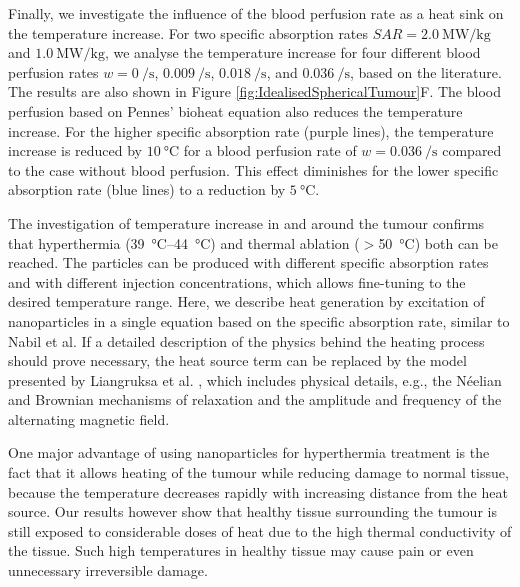 \documentclass[Times1COL,AMA]{WileyNJDv5} %
\begin{document}
Finally, we investigate the influence of the blood perfusion rate as a heat sink on the temperature increase.
For two specific absorption rates $SAR = \SI{2.0}{\mega\watt\per\kilo\gram}$ and $\SI{1.0}{\mega\watt\per\kilo\gram}$, we analyse the temperature increase for four different blood perfusion rates $w = \SI[per-mode=reciprocal]{0}{\per\second}$, $\SI[per-mode=reciprocal]{0.009}{\per\second}$, $\SI[per-mode=reciprocal]{0.018}{\per\second}$, and $\SI[per-mode=reciprocal]{0.036}{\per\second}$, based on the literature. \cite{Cervadoro2013}
The results are also shown in Figure \ref{fig:IdealisedSphericalTumour}F.
The blood perfusion based on Pennes' bioheat equation also reduces the temperature increase.
For the higher specific absorption rate (purple lines), the temperature increase is reduced by $\SI{10}{\celsius}$ for a blood perfusion rate of $w = \SI[per-mode=reciprocal]{0.036}{\per\second}$ compared to the case without blood perfusion.
This effect diminishes for the lower specific absorption rate (blue lines) to a reduction by $\SI{5}{\celsius}$.

The investigation of temperature increase in and around the tumour confirms that hyperthermia (\SIrange{39}{44}{\celsius}) and thermal ablation ($>$\SI{50}{\celsius}) both can be reached.
The particles can be produced with different specific absorption rates and with different injection concentrations, which allows fine-tuning to the desired temperature range. \cite{Wilhelm2016}
Here, we describe heat generation by excitation of nanoparticles in a single equation based on the specific absorption rate, similar to Nabil et al. \cite{Nabil2015}
If a detailed description of the physics behind the heating process should prove necessary, the heat source term can be replaced by the model presented by Liangruksa et al. \cite{Liangruksa2011}, which includes physical details, e.g., the Néelian and Brownian mechanisms of relaxation and the amplitude and frequency of the alternating magnetic field.

One major advantage of using nanoparticles for hyperthermia treatment is the fact that it allows heating of the tumour while reducing damage to normal tissue, because the temperature decreases rapidly with increasing distance from the heat source. \cite{Chatterjee2011}
Our results however show that healthy tissue surrounding the tumour is still exposed to considerable doses of heat due to the high thermal conductivity of the tissue.
Such high temperatures in healthy tissue may cause pain or even unnecessary irreversible damage.
\end{document}
